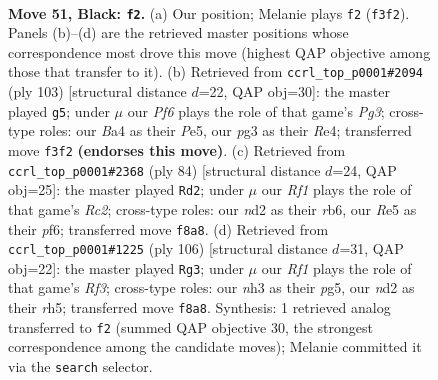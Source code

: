 \documentclass[11pt]{article}
\begin{document}
\clearpage

\begin{figure}[p]\centering
\begin{subfigure}{0.46\textwidth}\centering
\resizebox{\linewidth}{!}{%
\newchessgame
\chessboard[
  setfen={5r2/6k1/1p6/p1p1r3/b7/2P2pPN/1K1N3P/7R b - - 9 51},
  showmover=false,
  pgfstyle=straightmove, color=movearrow, markmove={f3-f2}
]}
\caption{}
\end{subfigure}\hfill
\begin{subfigure}{0.46\textwidth}\centering
\resizebox{\linewidth}{!}{%
\newchessgame
\chessboard[
  setfen={1k3N2/8/3p2pp/3Pp3/4rp1b/7P/2R2PP1/5K2 b - - 3 52},
  showmover=false,
  pgfstyle=straightmove, color=movearrow, markmove={g6-g5}
]}
\caption{}
\end{subfigure}
\\[4pt]
\begin{subfigure}{0.46\textwidth}\centering
\resizebox{\linewidth}{!}{%
\newchessgame
\chessboard[
  setfen={6k1/7p/pr3pp1/8/8/3n1PBP/1PR3P1/6K1 w - - 7 43},
  showmover=false,
  pgfstyle=straightmove, color=movearrow, markmove={c2-d2}
]}
\caption{}
\end{subfigure}\hfill
\begin{subfigure}{0.46\textwidth}\centering
\resizebox{\linewidth}{!}{%
\newchessgame
\chessboard[
  setfen={8/p3k3/Pp2p3/6pr/2P5/1P3R1P/4K3/8 w - - 12 54},
  showmover=false,
  pgfstyle=straightmove, color=movearrow, markmove={f3-g3}
]}
\caption{}
\end{subfigure}
\caption{\textbf{Move 51, Black: \texttt{f2}.} (a) Our position; Melanie plays \texttt{f2} (\texttt{f3f2}). Panels (b)--(d) are the retrieved master positions whose correspondence most drove this move (highest QAP objective among those that transfer to it). (b) Retrieved from \texttt{ccrl\_top\_p0001\#2094} (ply 103) [structural distance $d$=22, QAP obj=30]: the master played \texttt{g5}; under $\mu$ our \emph{Pf6} plays the role of that game's \emph{Pg3}; cross-type roles: our \emph{B}a4 as their \emph{P}e5, our \emph{p}g3 as their \emph{R}e4; transferred move \texttt{f3f2} \textbf{(endorses this move)}. (c) Retrieved from \texttt{ccrl\_top\_p0001\#2368} (ply 84) [structural distance $d$=24, QAP obj=25]: the master played \texttt{Rd2}; under $\mu$ our \emph{Rf1} plays the role of that game's \emph{Rc2}; cross-type roles: our \emph{n}d2 as their \emph{r}b6, our \emph{R}e5 as their \emph{p}f6; transferred move \texttt{f8a8}. (d) Retrieved from \texttt{ccrl\_top\_p0001\#1225} (ply 106) [structural distance $d$=31, QAP obj=22]: the master played \texttt{Rg3}; under $\mu$ our \emph{Rf1} plays the role of that game's \emph{Rf3}; cross-type roles: our \emph{n}h3 as their \emph{p}g5, our \emph{n}d2 as their \emph{r}h5; transferred move \texttt{f8a8}. Synthesis: 1 retrieved analog transferred to \texttt{f2} (summed QAP objective 30, the strongest correspondence among the candidate moves); Melanie committed it via the \texttt{search} selector.}
\label{fig:thought-m101}
\end{figure}
\end{document}
